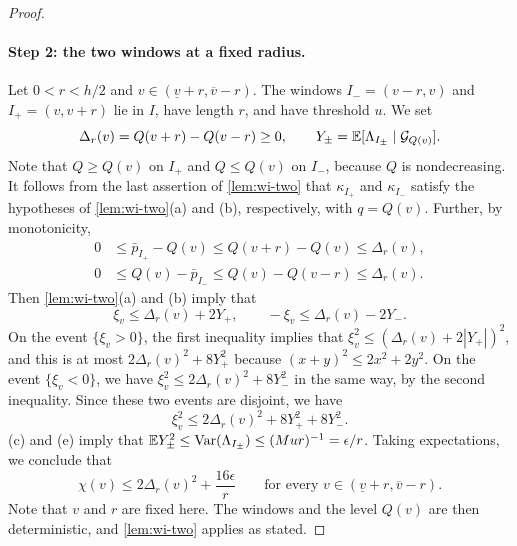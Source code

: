 \begin{proof}
\paragraph{Step 2: the two windows at a fixed radius.}
Let $0<r<h/2$ and $v\in(\underline v+r,\overline v-r)$. The windows
$I_-=(v-r,v)$ and $I_+=(v,v+r)$ lie in $I$, have length $r$, and have
threshold $u$. We set
\[
 \Delta_r(v)=Q(v+r)-Q(v-r)\ge0,\qquad
 Y_\pm=\mathbb E[\Lambda_{I_\pm}\mid\mathcal G_{Q(v)}].
\]
Note that $Q\ge Q(v)$ on $I_+$ and $Q\le Q(v)$ on $I_-$, because $Q$ is
nondecreasing. It follows from the last assertion of \cref{lem:wi-two}
that $\kappa_{I_+}$ and $\kappa_{I_-}$ satisfy the hypotheses of
\cref{lem:wi-two}(a) and (b), respectively, with $q=Q(v)$. Further, by
monotonicity,
\[
 \begin{aligned}
 0&\le\bar p_{I_+}-Q(v)\le Q(v+r)-Q(v)\le\Delta_r(v),\\
 0&\le Q(v)-\bar p_{I_-}\le Q(v)-Q(v-r)\le\Delta_r(v).
 \end{aligned}
\]
Then \cref{lem:wi-two}(a) and (b) imply that
\[
 \xi_v\le\Delta_r(v)+2Y_+,\qquad
 -\xi_v\le\Delta_r(v)-2Y_- .
\]
On the event $\{\xi_v>0\}$, the first inequality implies that
$\xi_v^2\le(\Delta_r(v)+2|Y_+|)^2$, and this is at most
$2\Delta_r(v)^2+8Y_+^2$ because $(x+y)^2\le2x^2+2y^2$. On the event
$\{\xi_v<0\}$, we have $\xi_v^2\le2\Delta_r(v)^2+8Y_-^2$ in the same way,
by the second inequality. Since these two events
are disjoint, we have
\[
 \xi_v^2\le2\Delta_r(v)^2+8Y_+^2+8Y_-^2 .
\]
(c) and (e) imply that
$\mathbb E Y_\pm^2\le\operatorname{Var}(\Lambda_{I_\pm})\le(Mur)^{-1}=\epsilon/r$. Taking
expectations, we conclude that
\begin{equation}\label{eq:wi-vpoint}
 \chi(v)\le2\Delta_r(v)^2+\frac{16\epsilon}{r}
 \qquad\text{for every }v\in(\underline v+r,\overline v-r).
\end{equation}
Note that $v$ and $r$ are fixed here. The windows and the level $Q(v)$
are then deterministic, and \cref{lem:wi-two} applies as stated.


\end{proof}
